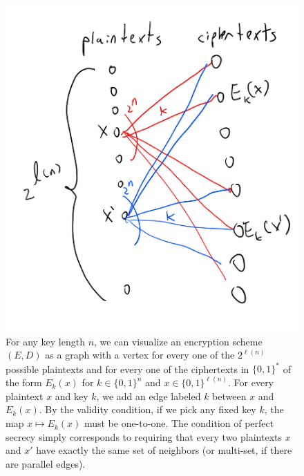 \begin{figure}
\centering
\includegraphics[width=\textwidth, height=0.25\paperheight, keepaspectratio]{../figure/perfectsecrecy.png}
\caption{For any key length \(n\), we can visualize an encryption scheme
\((E,D)\) as a graph with a vertex for every one of the \(2^{\ell(n)}\)
possible plaintexts and for every one of the ciphertexts in
\(\{0,1\}^*\) of the form \(E_k(x)\) for \(k\in \{0,1\}^n\) and
\(x\in \{0,1\}^{\ell(n)}\). For every plaintext \(x\) and key \(k\), we
add an edge labeled \(k\) between \(x\) and \(E_k(x)\). By the validity
condition, if we pick any fixed key \(k\), the map \(x \mapsto E_k(x)\)
must be one-to-one. The condition of perfect secrecy simply corresponds
to requiring that every two plaintexts \(x\) and \(x'\) have exactly the
same set of neighbors (or multi-set, if there are parallel edges).}
\label{perfectsecfig}
\end{figure}

